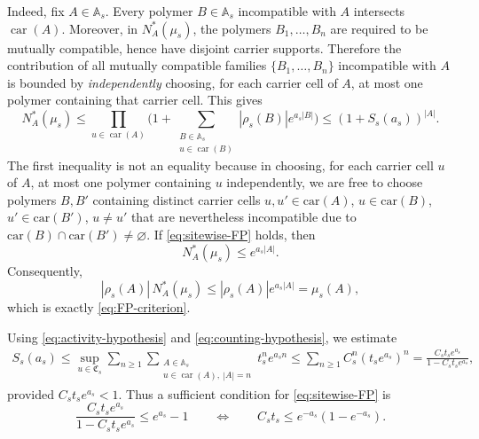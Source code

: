 Indeed, fix \(A\in\mathbb A_s\). Every polymer \(B \in \mathbb A_s\) incompatible with \(A\) intersects
\(\operatorname{car}(A)\). Moreover, in \(N_A^*(\mu_s)\), the polymers
\(B_1,\dots,B_n\) are required to be mutually compatible, hence have disjoint carrier
supports. Therefore the contribution of all mutually compatible families
\(\{B_1,\dots,B_n\}\) incompatible with \(A\) is bounded by \emph{independently} choosing, for
each carrier cell of \(A\), at most one polymer containing that carrier cell. This gives
\begin{equation}
	N_A^*(\mu_s)
	\le
	\prod_{u\in\operatorname{car}(A)}
	\Biggl(
	1+
	\sum_{\substack{B\in\mathbb A_s\\ u\in\operatorname{car}(B)}}
	|\rho_s(B)|e^{a_s|B|}
	\Biggr)
	\le
	(1+S_s(a_s))^{|A|}.
	\label{eq:NA-star-site-bound}
\end{equation}
The first inequality is not an equality because in choosing, for each carrier cell $u$ of $A$, at most one polymer containing $u$ independently, we are free to choose polymers $B, B'$ containing distinct carrier cells $u,u'\in \mathrm{car}(A)$, $u\in\mathrm{car}(B)$, $u'\in\mathrm{car}(B')$, $u \ne u'$ that are nevertheless incompatible due to $\mathrm{car}(B) \cap \mathrm{car}(B') \ne \varnothing$. If \eqref{eq:sitewise-FP} holds, then
\begin{equation}
N_A^*(\mu_s)\le e^{a_s|A|}.
\end{equation}
Consequently,
\begin{equation}
|\rho_s(A)|\,N_A^*(\mu_s)
\le
|\rho_s(A)|e^{a_s|A|}
=
\mu_s(A),
\end{equation}
which is exactly \eqref{eq:FP-criterion}.

Using \eqref{eq:activity-hypothesis} and \eqref{eq:counting-hypothesis}, we estimate
\begin{align}
	S_s(a_s)
	\le
	\sup_{u\in\mathfrak C_s}
	\sum_{n\ge 1}
	\sum_{\substack{A\in\mathbb A_s\\
			u\in\operatorname{car}(A),\ |A|=n}}
	t_s^n e^{a_s n}
	\le
	\sum_{n\ge 1}
	C_s^n(t_s e^{a_s})^n
	=
	\frac{C_s t_s e^{a_s}}{1-C_s t_s e^{a_s}},
	\label{eq:sitewise-series}
\end{align}
provided \(C_s t_s e^{a_s}<1\). Thus a sufficient condition for
\eqref{eq:sitewise-FP} is
\begin{equation}
	\frac{C_s t_s e^{a_s}}{1-C_s t_s e^{a_s}}
	\le
	e^{a_s}-1
	\qquad\Leftrightarrow\qquad
	C_s t_s \le e^{-a_s}(1-e^{-a_s}).
	\label{eq:main-low-activity-condition}
\end{equation}

